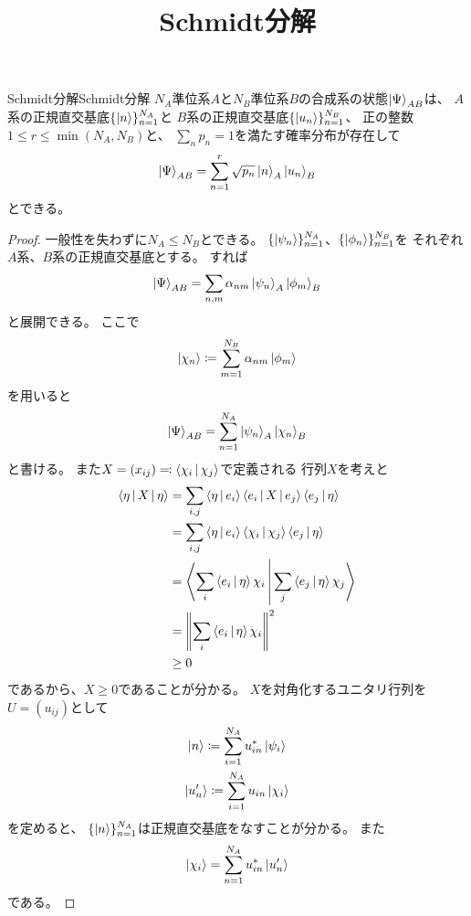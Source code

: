 \documentclass[a4paper, 10pt]{jsarticle}
\title{Schmidt分解}
\author{}
\begin{document}
\maketitle

\begin{thm}{Schmidt分解}{Schmidt分解}
	$N_A$準位系$A$と$N_B$準位系$B$の合成系の状態$\Ket{\Psi}_{AB}$は、
	$A$系の正規直交基底$\{\Ket{n}\}_{n=1}^{N_A}$と
	$B$系の正規直交基底$\{\Ket{u_n}\}_{n=1}^{N_B}$、
	正の整数$1 \leq r \leq \min (N_A, N_B)$と、
	$\sum_{n} p_n = 1$を満たす確率分布が存在して
	\begin{align}
		\Ket{\Psi}_{AB}
		= \sum_{n=1}^{r} \sqrt{p_n} \Ket{n}_A \Ket{u_n}_B
	\end{align}
	とできる。
\end{thm}
\begin{proof}
	一般性を失わずに$N_A \leq N_B$とできる。
	$\{\Ket{\psi_n}\}_{n=1}^{N_A}$、$\{\Ket{\phi_n}\}_{n=1}^{N_B}$を
	それぞれ$A$系、$B$系の正規直交基底とする。
	すれば
	\begin{align}
		\Ket{\Psi}_{AB}
		= \sum_{n, m} \alpha_{nm} \Ket{\psi_n}_A \Ket{\phi_m}_B
	\end{align}
	と展開できる。
	ここで
	\begin{align}
		\Ket{\chi_n} \coloneqq \sum_{m=1}^{N_B} \alpha_{nm} \Ket{\phi_m}
	\end{align}
	を用いると
	\begin{align}
		\Ket{\Psi}_{AB}
		= \sum_{n=1}^{N_A} \Ket{\psi_n}_A \Ket{\chi_n}_B
	\end{align}
	と書ける。
	また$X = (x_{ij}) \eqqcolon \Braket{\chi_i | \chi_j}$で定義される
	行列$X$を考えと
	\begin{align}
		\Braket{\eta | X | \eta}
		&= \sum_{i,j} \Braket{\eta | e_i}
		\Braket{e_i | X | e_j} \Braket{e_j | \eta} \\
		&= \sum_{i,j} \Braket{\eta | e_i} \Braket{\chi_i | \chi_j}
		\Braket{e_j | \eta} \\
		&= \Braket{\sum_i \Braket{e_i | \eta} \chi_i |
		\sum_j \Braket{e_j | \eta} \chi_j} \\
		&= \left\| \sum_i \Braket{e_i | \eta} \chi_i \right\|^2 \\
		&\geq 0
	\end{align}
	であるから、$X \geq 0$であることが分かる。
	$X$を対角化するユニタリ行列を$U = (u_{ij})$として
	\begin{gather}
		\Ket{n} \coloneqq \sum_{i=1}^{N_A} u^*_{in} \Ket{\psi_i} \\
		\Ket{u'_n} \coloneqq \sum_{i=1}^{N_A} u_{in} \Ket{\chi_i}
	\end{gather}
	を定めると、
	$\{\Ket{n}\}_{n=1}^{N_A}$は正規直交基底をなすことが分かる。
	また
	\begin{align}
		\Ket{\chi_i} = \sum_{n=1}^{N_A} u^*_{in} \Ket{u'_n}
	\end{align}
	である。


\end{proof}
\end{document}
